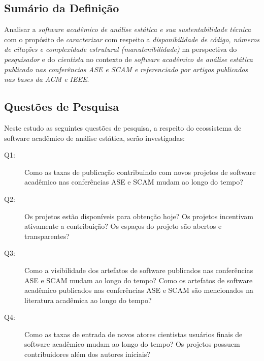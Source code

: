 \subsection{Sumário da Definição}



Analisar a \textit{software acadêmico de análise estática e sua sustentabilidade técnica} %
com o propósito de \textit{caracterizar}  %
com respeito a \textit{disponibilidade de código, números de citações e complexidade estrutural (manutenibilidade)}  %
na perspectiva do \textit{pesquisador} e do \textit{cientista}%
no contexto de \textit{software acadêmico de análise estática publicado nas conferências ASE e SCAM 
e referenciado por artigos publicados nas bases da ACM e IEEE}. %
%


\subsection{Questões de Pesquisa}

Neste estudo as seguintes questões de pesquisa, a respeito do ecossistema de
software acadêmico de análise estática, serão investigadas:

\newcommand{\QuestaoUm}{Como as taxas de publicação contribuindo com novos projetos de software acadêmico nas conferências ASE e SCAM mudam ao longo do tempo?}
\newcommand{\QuestaoDois}{Os projetos estão disponíveis para obtenção hoje? Os projetos incentivam ativamente a contribuição? Os espaços do projeto são abertos e transparentes?}
\newcommand{\QuestaoTres}{Como a visibilidade dos artefatos de software publicados nas conferências ASE e SCAM mudam ao longo do tempo? Como os artefatos de software acadêmico publicados nas conferências ASE e SCAM são mencionados na literatura acadêmica ao longo do tempo?}
\newcommand{\QuestaoQuatro}{Como as taxas de entrada de novos atores cientistas usuários finais de software acadêmico mudam ao longo do tempo? Os projetos possuem contribuidores além dos autores iniciais?}

\begin{description}
  \item [Q1:] \QuestaoUm
  \item [Q2:] \QuestaoDois
  \item [Q3:] \QuestaoTres
  \item [Q4:] \QuestaoQuatro
\end{description}

